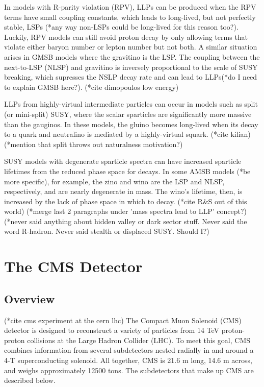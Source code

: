 \documentclass[12pt]{article}
\begin{document}
    In models with R-parity violation (RPV), LLPs can be produced when the RPV terms have small coupling constants, which leads to long-lived, but not perfectly stable, LSPs (*any way non-LSPs could be long-lived for this reason too?). Luckily, RPV models can still avoid proton decay by only allowing terms that violate either baryon number or lepton number but not both. A similar situation arises in GMSB models where the gravitino is the LSP. The coupling between the next-to-LSP (NLSP) and gravitino is inversely proportional to the scale of SUSY breaking, which supresses the NSLP decay rate and can lead to LLPs(*do I need to explain GMSB here?). (*cite dimopoulos low energy)

    LLPs from highly-virtual intermediate particles can occur in models such as split (or mini-split) SUSY, where the scalar sparticles are significantly more massive than the gauginos. In these models, the gluino becomes long-lived when its decay to a quark and neutralino is mediated by a highly-virtual squark. (*cite kilian) (*mention that split throws out naturalness motivation?)

    SUSY models with degenerate sparticle spectra can have increased sparticle lifetimes from the reduced phase space for decays. In some AMSB models (*be more specific), for example, the zino and wino are the LSP and NLSP, respectively, and are nearly degenerate in mass. The wino's lifetime, then, is increased by the lack of phase space in which to decay. (*cite R\&S out of this world)
    (*merge last 2 paragraphs under 'mass spectra lead to LLP' concept?)
    (*never said anything about hidden valley or dark sector stuff. Never said the word R-hadron. Never said stealth or displaced SUSY. Should I?)

\section{The CMS Detector}
\subsection{Overview}
        (*cite cms experiment at the cern lhc)
          The Compact Muon Solenoid (CMS) detector is designed to reconstruct a variety of particles from 14 TeV proton-proton collisions at the Large Hadron Collider (LHC). To meet this goal, CMS combines information from several subdetectors nested radially in and around a 4-T superconducting solenoid. All together, CMS is 21.6 m long, 14.6 m across, and weighs approximately 12500 tons. The subdetectors that make up CMS are described below.
\end{document}
